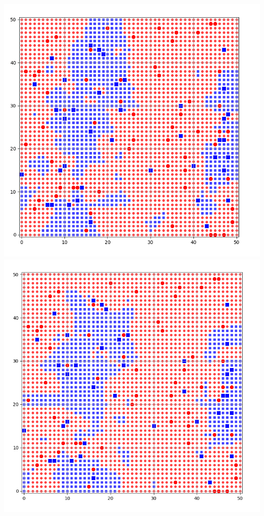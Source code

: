 \documentclass[11pt,class=report,crop=false]{standalone}
\begin{document}
\begin{activite}
\begin{enumerate}
\begin{enumerate}
\begin{center}
	\includegraphics[scale=\myscale,scale=0.133]{ecran-voisins-9c}
	\includegraphics[scale=\myscale,scale=0.13]{ecran-voisins-9d}	
\end{center}		 
		
		
	\end{enumerate}
		
\end{enumerate}
	
\end{activite}
\end{document}

